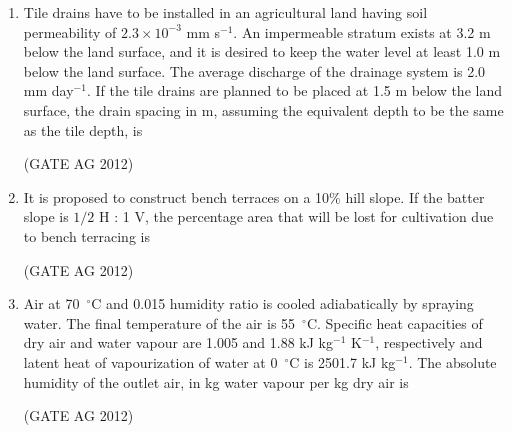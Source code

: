 \documentclass[journal]{IEEEtran}
\begin{document}
\begin{enumerate}
\item
 Tile drains have to be installed in an agricultural land having soil permeability of $2.3\times 10^{-3}$ mm s$^{-1}$. An impermeable stratum exists at 3.2 m below the land surface, and it is desired to keep the water level at least 1.0 m below the land surface. The average discharge of the drainage system is 2.0 mm day$^{-1}$. If the tile drains are planned to be placed at 1.5 m below the land surface, the drain spacing in m, assuming the equivalent depth to be the same as the tile depth, is
\begin{enumerate}
\begin{multicols}{2}
\item 10.6
\item 12.4
\item 13.9
]\item 19.7
\end{multicols}
\end{enumerate}
\hfill(GATE AG 2012)\\

\medskip

\item
 It is proposed to construct bench terraces on a 10\% hill slope. If the batter slope is $1/2$ H : 1 V, the percentage area that will be lost for cultivation due to bench terracing is
\begin{enumerate}
\end{enumerate}
\hfill(GATE AG 2012)\\

\medskip

\item
 Air at 70~$^\circ$C and 0.015 humidity ratio is cooled adiabatically by spraying water. The final temperature of the air is 55~$^\circ$C. Specific heat capacities of dry air and water vapour are 1.005 and 1.88 kJ kg$^{-1}$ K$^{-1}$, respectively and latent heat of vapourization of water at 0~$^\circ$C is 2501.7 kJ kg$^{-1}$. The absolute humidity of the outlet air, in kg water vapour per kg dry air is
\begin{enumerate}
\end{enumerate}
\hfill(GATE AG 2012)\\


\end{enumerate}
\end{document}
